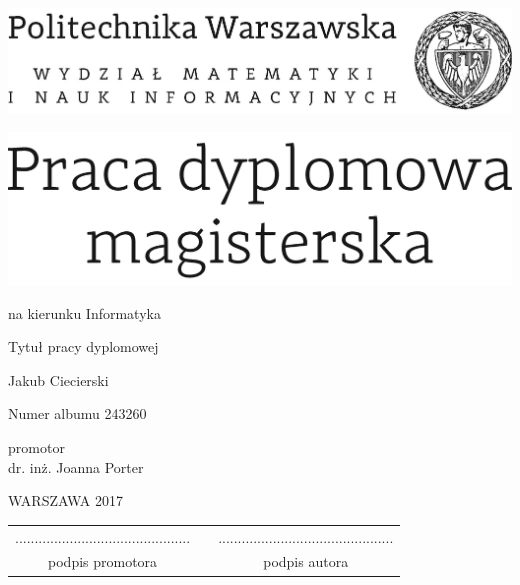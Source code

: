 \documentclass[12pt,twoside,a4paper]{article}
\newcommand{\discipline}{Informatyka}
\renewcommand{\title}{Tytuł pracy dyplomowej}
\renewcommand{\author}{Jakub Ciecierski}
\newcommand{\supervisor}{dr. inż. Joanna Porter}
\newcommand{\album}{243260}
\renewcommand{\year}{2017}
\begin{document}
\pagestyle{empty}

\begin{center}
\includegraphics[scale=1.]{politechnika} 
\vspace{70pt}


\includegraphics[scale=1.]{praca_mgr} %

{ \arial na kierunku \discipline

\vspace{40pt}
{\arial \large \title}

\vspace{50pt}

{\arial \huge \author}

\vspace{5pt}

Numer albumu \album

\vspace{40pt}

promotor \\
{\arial \supervisor}

\vspace{15pt}
 

 \vfill
WARSZAWA \year \\
}
\end{center}




\newpage
\null

\vfill

\begin{center}
\begin{tabular}[t]{ccc}
............................................. & \hspace*{100pt} & .............................................\\
podpis promotora & \hspace*{100pt} & podpis autora
\end{tabular}
\end{center}
\end{document}

